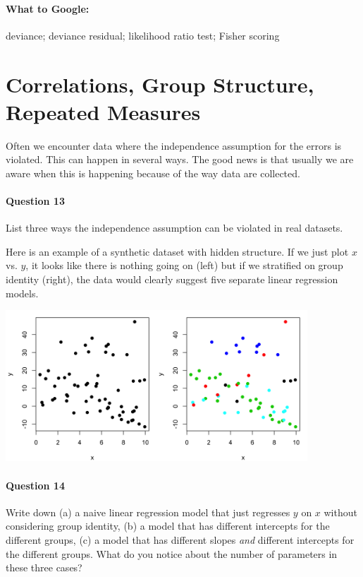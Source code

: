 \paragraph{What to Google:} deviance; deviance residual; likelihood ratio test; Fisher scoring
\newpage


\section{Correlations, Group Structure, Repeated Measures}

Often we encounter data where the independence assumption for the errors is violated. This can happen in several ways. The good news is that usually we are aware when this is happening because of the way data are collected.

\paragraph{Question 13} List three ways the independence assumption can be violated in real datasets.


\vspace{30mm}

Here is an example of a synthetic dataset with hidden structure. If we just plot $x$ vs. $y$, it looks like there is nothing going on (left) but if we stratified on group identity (right), the data would clearly suggest five separate linear regression models.

\begin{center}
\includegraphics[width=0.85\textwidth]{img/correlated-plots.png}
\end{center}

\paragraph{Question 14} Write down (a) a naive linear regression model that just regresses $y$ on $x$ without considering group identity, (b) a model that has different intercepts for the different groups, (c) a model that has different slopes \emph{and} different intercepts for the different groups. What do you notice about the number of parameters in these three cases?

